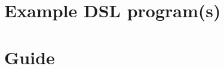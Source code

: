 \documentclass[a4paper]{article}
\begin{document}

\section{Example DSL program(s)}
\label{sec:example-dsl-programs}


\section{Guide}
\label{sec:guide}

\end{document}
